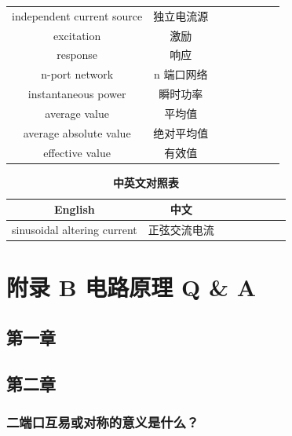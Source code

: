 \documentclass[UTF8]{report}
\theoremstyle{MyLineTheoremStyle} %
\theoremstyle{MyBlockTheoremStyle} %
\theoremstyle{MySubsubsectionStyle} %
\begin{document}
\begin{multicols}{2}
\begin{table}[H]
\begin{tabular}{cccccccc}
    independent current source & 独立电流源 \\ 
    excitation & 激励 \\
    response & 响应 \\
    n-port network & n 端口网络 \\
    instantaneous power & 瞬时功率 \\
    average value & 平均值 \\
    average absolute value & 绝对平均值 \\
    effective value & 有效值 \\
    \bottomrule
\end{tabular}
\end{table}

\begin{table}[H]\centering
    \caption{\textbf{中英文对照表}}
    \begin{tabular}{cccccccc}\toprule
        English & 中文 \\
        \midrule
        sinusoidal altering current & 正弦交流电流 \\
        \bottomrule
    \end{tabular}
\end{table}

\end{multicols} 

\chapter*{附录 B\hspace*{20pt} 电路原理 Q \& A}   
\thispagestyle{fancy} 
\setcounter{section}{0}   
\renewcommand\thesection{B.\arabic{section}}   
\renewcommand{\thefigure}{B.\arabic{figure}} 
\renewcommand{\thetable}{B.\arabic{table}}

\section{第一章}

\section{第二章}

\subsection{二端口互易或对称的意义是什么？}
\end{document}
